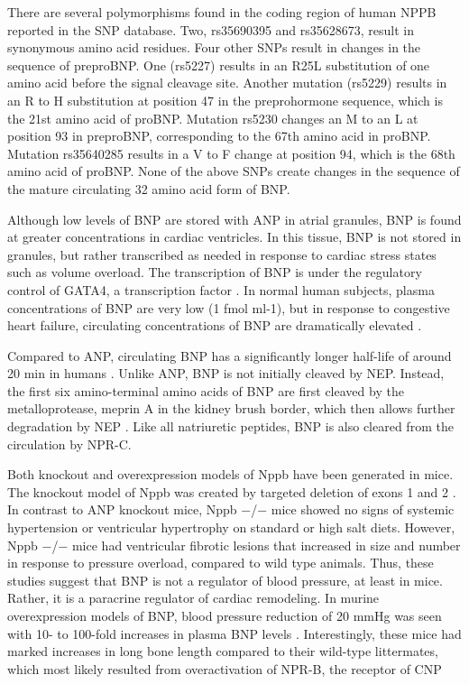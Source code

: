 \documentclass[14pt,a4paper,onecolumn]{article}
\begin{document}
There are several polymorphisms found in the coding region of human NPPB reported in the SNP database. Two, rs35690395 and rs35628673, result in synonymous amino acid residues. Four other SNPs result in changes in the sequence of preproBNP. One (rs5227) results in an R25L substitution of one amino acid before the signal cleavage site. Another mutation (rs5229) results in an R to H substitution at position 47 in the preprohormone sequence, which is the 21st amino acid of proBNP. Mutation rs5230 changes an M to an L at position 93 in preproBNP, corresponding to the 67th amino acid in proBNP. Mutation rs35640285 results in a V to F change at position 94, which is the 68th amino acid of proBNP. None of the above SNPs create changes in the sequence of the mature circulating 32 amino acid form of BNP.

Although low levels of BNP are stored with ANP in atrial granules, BNP is found at greater concentrations in cardiac ventricles. In this tissue, BNP is not stored in granules, but rather transcribed as needed in response to cardiac stress states such as volume overload. The transcription of BNP is under the regulatory control of GATA4, a transcription factor \citep{Grepin1994} \citep{Thuerauf1994}. In normal human subjects, plasma concentrations of BNP are very low (1 fmol ml-1), but in response to congestive heart failure, circulating concentrations of BNP are dramatically elevated \citep{Mukoyama1991} \citep{Mukoyama1990}.

Compared to ANP, circulating BNP has a significantly longer half-life of around 20 min in humans \citep{Mukoyama1991} \citep{Mukoyama1990}. Unlike ANP, BNP is not initially cleaved by NEP. Instead, the first six amino-terminal amino acids of BNP are first cleaved by the metalloprotease, meprin A in the kidney brush border, which then allows further degradation by NEP \citep{Pankow2007}. Like all natriuretic peptides, BNP is also cleared from the circulation by NPR-C.

Both knockout and overexpression models of Nppb have been generated in mice. The knockout model of Nppb was created by targeted deletion of exons 1 and 2 \citep{Tamura2000}. In contrast to ANP knockout mice, Nppb −/− mice showed no signs of systemic hypertension or ventricular hypertrophy on standard or high salt diets. However, Nppb −/− mice had ventricular fibrotic lesions that increased in size and number in response to pressure overload, compared to wild type animals. Thus, these studies suggest that BNP is not a regulator of blood pressure, at least in mice. Rather, it is a paracrine regulator of cardiac remodeling. In murine overexpression models of BNP, blood pressure reduction of 20 mmHg was seen with 10- to 100-fold increases in plasma BNP levels \citep{Ogawa1994a}. Interestingly, these mice had marked increases in long bone length compared to their wild-type littermates, which most likely resulted from overactivation of NPR-B, the receptor of CNP
\end{document}
